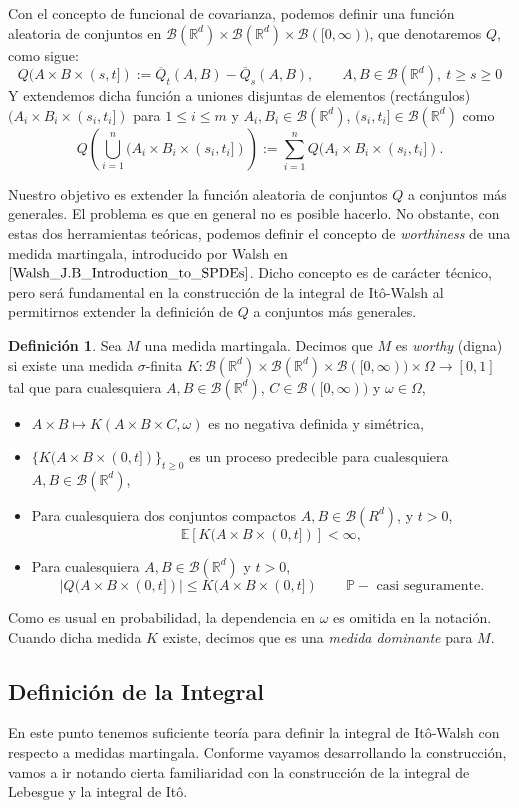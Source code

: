 \documentclass[letterpaper,twoside,12pt]{book}
\newcommand{\R}{\mathbb{R}}
\newcommand{\B}{\mathcal{B}}
\newcommand{\E}{\mathbb{E}}
\renewcommand{\P}{\mathbb{P}}
\newcommand{\1}{\mathds{1}}
\newcommand{\abs}[1]{\left\lvert #1 \right\rvert}
\renewcommand{\to}{\rightarrow}
\theoremstyle{definition}
\newtheorem{dfn}{Definición}
\theoremstyle{definition}
\theoremstyle{definition}
\theoremstyle{definition}
\theoremstyle{definition}
\theoremstyle{definition}
\theoremstyle{definition}
\begin{document}
Con el concepto de funcional de covarianza, podemos definir una función aleatoria de conjuntos en $\B(\R^{d})\times \B(\R^{d})\times \B([0,\infty))$, que denotaremos $Q$, como sigue:
\[
    Q(A\times B\times(s,t]):=\overline{Q}_t(A,B)-\overline{Q}_s(A,B), \qquad A,B\in \B(\R^{d}), \ t\geq s\geq 0
    \]
Y extendemos dicha función a uniones disjuntas de elementos (rectángulos)
$(A_i\times B_i\times(s_i,t_i])$ para $1\leq i \leq m$ y $A_i,B_i\in \B(\R^{d})$, $(s_i,t_i]\in \B(\R^{d})$ como 
\[
Q \left(\bigcup_{i=1}^{n}(A_i\times B_i\times(s_i,t_i])\right):=\sum_{i=1}^{n}Q(A_i\times B_i\times (s_i,t_i]).
\]
   
Nuestro objetivo es extender la función aleatoria de conjuntos $Q$ a conjuntos más generales. El problema es que en general no es posible hacerlo. No obstante, con estas dos herramientas teóricas, podemos definir el concepto de \textit{worthiness} de una medida martingala, introducido por Walsh en $\cite{Walsh_J.B_Introduction_to_SPDEs}$.
 Dicho concepto es de carácter técnico, pero será fundamental en la construcción de la integral de Itô-Walsh al permitirnos extender la definición de $Q$ a conjuntos más generales.


\begin{dfn} 
 Sea $M$ una medida martingala. Decimos que $M$ es \textit{worthy} (digna) si existe una medida $\sigma$-finita $K:\B(\R^{d})\times \B(\R^{d})\times \B([0,\infty))\times \Omega \to [0,1]$ tal que para cualesquiera $A,B\in \B(\R^{d})$, $C\in \B([0,\infty))$ y $\omega \in \Omega$, 
 \begin{itemize}
    \item $A\times B\mapsto K(A\times B \times C,\omega)$ es no negativa definida y simétrica,
    \item $\{K(A\times B \times (0,t])\}_{t\geq0}$ es un proceso predecible para cualesquiera $A, B \in \B(\R^{d})$,
    \item Para cualesquiera dos conjuntos compactos $A,B \in \B(R^{d})$, y $t>0$, 
    \[
    \E\left[K(A\times B \times (0,t])\right]<\infty,    
    \]
    \item Para cualesquiera $A,B\in \B(\R^{d})$ y $t>0$,
    \[
    \abs{Q(A\times B \times (0,t])}\leq K(A\times B \times (0,t]) \qquad \P-\text{ casi seguramente.}   
    \]
 \end{itemize}
Como es usual en probabilidad, la dependencia en $\omega$ es omitida en la notación. Cuando dicha medida $K$ existe, decimos que es una \textit{medida dominante} para $M$.
\end{dfn}
\subsection{Definición de la Integral}
En este punto tenemos suficiente teoría para definir la integral de Itô-Walsh con respecto a medidas martingala. Conforme vayamos desarrollando la construcción, vamos a ir notando cierta familiaridad con la construcción de la integral de Lebesgue y la integral de Itô.
\end{document}
